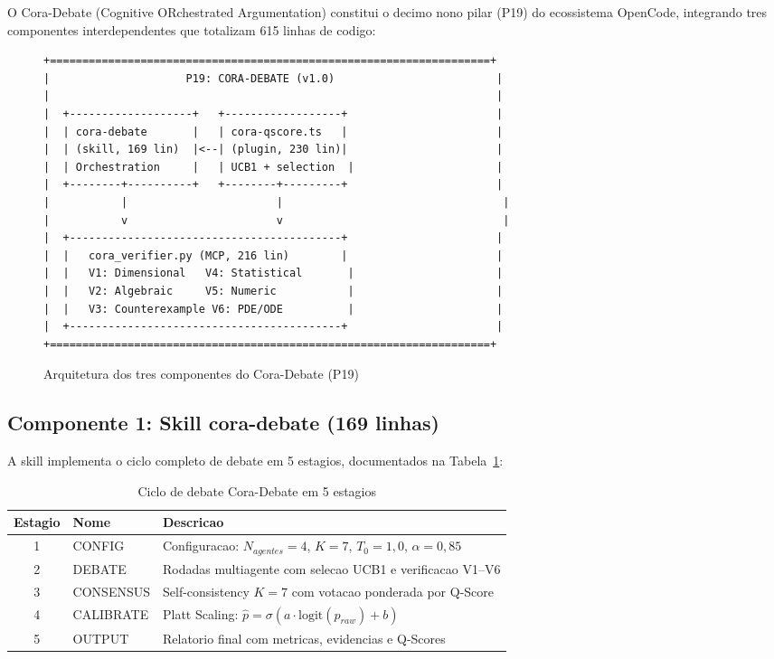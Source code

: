 \documentclass[5p]{elsarticle}
\begin{document}
O Cora-Debate (Cognitive ORchestrated Argumentation) constitui o decimo nono pilar (P19) do ecossistema OpenCode, integrando tres componentes interdependentes que totalizam 615 linhas de codigo:

\begin{figure}[H]
  \centering
  \begin{verbatim}
+====================================================================+
|                     P19: CORA-DEBATE (v1.0)                         |
|                                                                     |
|  +-------------------+   +------------------+                       |
|  | cora-debate       |   | cora-qscore.ts   |                       |
|  | (skill, 169 lin)  |<--| (plugin, 230 lin)|                       |
|  | Orchestration     |   | UCB1 + selection  |                      |
|  +--------+----------+   +--------+---------+                       |
|           |                       |                                  |
|           v                       v                                  |
|  +------------------------------------------+                       |
|  |   cora_verifier.py (MCP, 216 lin)        |                       |
|  |   V1: Dimensional   V4: Statistical       |                      |
|  |   V2: Algebraic     V5: Numeric           |                      |
|  |   V3: Counterexample V6: PDE/ODE          |                      |
|  +------------------------------------------+                       |
+====================================================================+
  \end{verbatim}
  \caption{Arquitetura dos tres componentes do Cora-Debate (P19)}
  \label{fig:arch}
\end{figure}

\subsection{Componente 1: Skill cora-debate (169 linhas)}

A skill implementa o ciclo completo de debate em 5 estagios, documentados na Tabela~\ref{tab:stages}:

\begin{table}[H]
  \centering
  \caption{Ciclo de debate Cora-Debate em 5 estagios}
  \label{tab:stages}
  \begin{tabular}{clp{8cm}}
    \toprule
    \textbf{Estagio} & \textbf{Nome} & \textbf{Descricao} \\
    \midrule
    1 & CONFIG & Configuracao: $N_{agentes}=4$, $K=7$, $T_0=1,0$, $\alpha=0,85$ \\
    2 & DEBATE & Rodadas multiagente com selecao UCB1 e verificacao V1--V6 \\
    3 & CONSENSUS & Self-consistency $K=7$ com votacao ponderada por Q-Score \\
    4 & CALIBRATE & Platt Scaling: $\hat{p} = \sigma(a \cdot \mathrm{logit}(p_{raw}) + b)$ \\
    5 & OUTPUT & Relatorio final com metricas, evidencias e Q-Scores \\
    \bottomrule
  \end{tabular}
\end{table}
\end{document}
